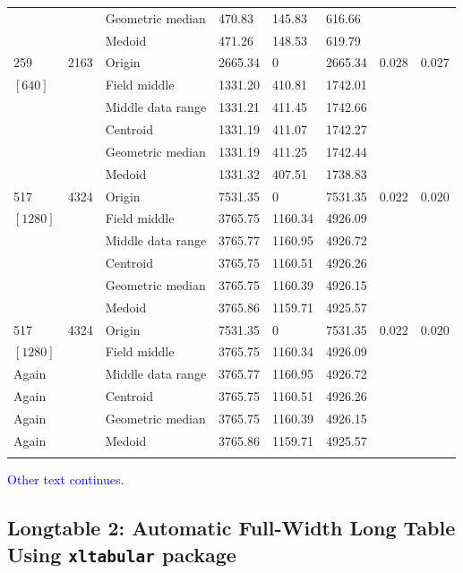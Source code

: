 \documentclass[phd,showframe]{ndsu-thesis-2022}
\newcommand\italk[1]{\textcolor{blue}{#1}}  %
\begin{document}
{{\begin{longtable}{lll lll ll}
 &  & Geometric median & 470.83 & 145.83 & 616.66 \\
 &  & Medoid  & 471.26 & 148.53 & 619.79 \\
\midrule
259 & 2163 & Origin  & 2665.34 & 0 & 2665.34 & 0.028 & 0.027 \\
$[640]$ &  & Field middle  & 1331.20 & 410.81 & 1742.01 \\
 &  & Middle data range  & 1331.21 & 411.45 & 1742.66 \\
 &  & Centroid & 1331.19 & 411.07 & 1742.27 \\
 &  & Geometric median & 1331.19 & 411.25 & 1742.44 \\
 &  & Medoid  & 1331.32 & 407.51 & 1738.83 \\
\midrule
517 & 4324 & Origin  & 7531.35 & 0 & 7531.35 & 0.022 & 0.020 \\
$[1280]$ &  & Field middle  & 3765.75 & 1160.34 & 4926.09 \\
 &  & Middle data range  & 3765.77 & 1160.95 & 4926.72 \\
 &  & Centroid & 3765.75 & 1160.51 & 4926.26 \\
 &  & Geometric median & 3765.75 & 1160.39 & 4926.15 \\
 &  & Medoid  & 3765.86 & 1159.71 & 4925.57 \\
\midrule
517 & 4324 & Origin  & 7531.35 & 0 & 7531.35 & 0.022 & 0.020 \\
$[1280]$ &  & Field middle  & 3765.75 & 1160.34 & 4926.09 \\
 Again &  & Middle data range  & 3765.77 & 1160.95 & 4926.72 \\
 Again &  & Centroid & 3765.75 & 1160.51 & 4926.26 \\
 Again &  & Geometric median & 3765.75 & 1160.39 & 4926.15 \\
 Again &  & Medoid  & 3765.86 & 1159.71 & 4925.57 \\
\bottomrule
\label{longtab1} %
\end{longtable} 
}%
}%
\endgroup

\setlength{\parindent}{0.5in}
\vspace{-2ex}

\italk{Other text continues.} \kant[9]




\subsection{Longtable 2:  Automatic Full-Width Long Table Using \texttt{xltabular} package}
\end{document}
